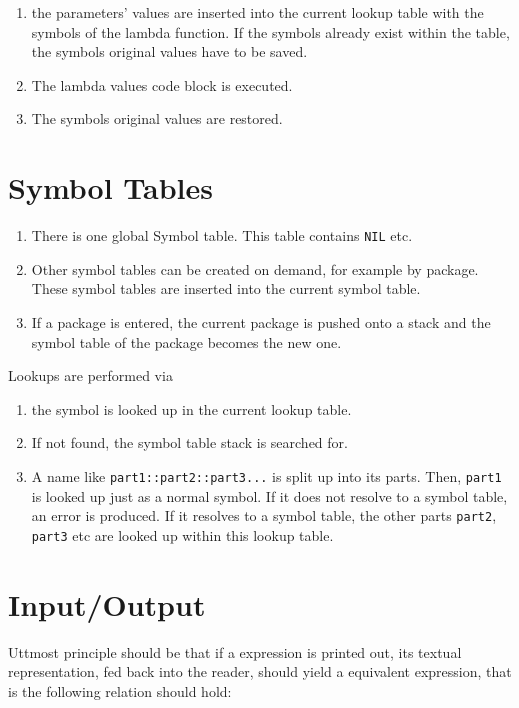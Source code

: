\documentclass[12pt]{article}
\begin{document}
\begin{enumerate}
\item  the parameters' values are inserted into the current lookup table  with the 
symbols of the lambda function. If the symbols already exist within the table,
the symbols original values have to be saved.
\item The lambda values code block is executed.
\item The symbols original values are restored.
\end{enumerate}


\section{Symbol Tables}

\begin{enumerate}
\item There is one global Symbol table. This table contains \texttt{NIL} etc.
\item Other symbol tables can be created on demand, for example by package.
These symbol tables are inserted into the current symbol table.
\item If a package is entered, the current package is pushed onto a stack and
the symbol table of the package becomes the new one.
\end{enumerate}

Lookups are performed via

\begin{enumerate}
\item the symbol is looked up in the current lookup table.
\item If not found, the symbol table stack is searched for.
\item A name like \texttt{part1::part2::part3...} is split up into its parts. Then,
\texttt{part1} is looked up just as a normal symbol. If it does not resolve to a symbol
table, an error is produced. If it resolves to a symbol table, the other parts
\texttt{part2}, \texttt{part3} etc are looked up within this lookup table.
\end{enumerate}


\section{Input/Output}

Uttmost principle should be that if a expression is printed out, its textual
representation, fed back into the reader, should yield a equivalent expression,
that is the following relation should hold:
\end{document}
